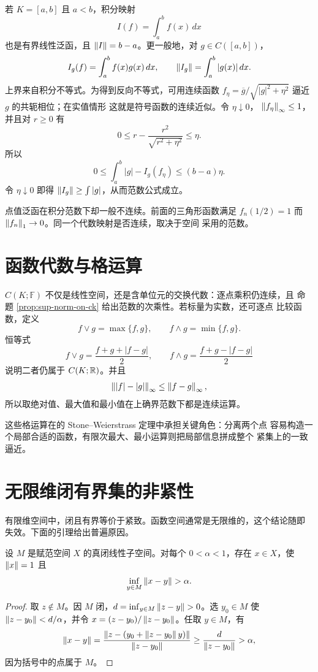 若 $K=[a,b]$ 且 $a<b$，积分映射
\[
 I(f)=\int_a^bf(x)\,dx
\]
也是有界线性泛函，且 $\left\lVert I\right\rVert=b-a$。更一般地，对
$g\in C([a,b])$，
\[
 I_g(f)=\int_a^bf(x)g(x)\,dx,
 \qquad \left\lVert I_g\right\rVert=\int_a^b|g(x)|\,dx.
\]
上界来自积分不等式。为得到反向不等式，可用连续函数
$f_\eta=\overline g/\sqrt{|g|^2+\eta^2}$ 逼近 $g$ 的共轭相位；在实值情形
这就是符号函数的连续近似。令 $\eta\downarrow0$，
$\left\lVert f_\eta\right\rVert_\infty\le1$，并且对 $r\ge0$ 有
\[
 0\le r-\frac{r^2}{\sqrt{r^2+\eta^2}}\le\eta.
\]
所以
\[
 0\le\int_a^b|g|-I_g(f_\eta)\le(b-a)\eta.
\]
令 $\eta\downarrow0$ 即得 $\left\lVert I_g\right\rVert\ge\int|g|$，从而范数公式成立。

点值泛函在积分范数下却一般不连续。前面的三角形函数满足
$f_n(1/2)=1$ 而 $\left\lVert f_n\right\rVert_1\to0$。同一个代数映射是否连续，取决于空间
采用的范数。

\section{函数代数与格运算}

$C(K;\mathbb F)$ 不仅是线性空间，还是含单位元的交换代数：逐点乘积仍连续，且
命题 \ref{prop:sup-norm-on-ck} 给出范数的次乘性。若标量为实数，还可逐点
比较函数，定义
\[
 f\vee g=\max\{f,g\},\qquad f\wedge g=\min\{f,g\}.
\]
恒等式
\[
 f\vee g=\frac{f+g+|f-g|}{2},\qquad
 f\wedge g=\frac{f+g-|f-g|}{2}
\]
说明二者仍属于 $C(K;\mathbb{R})$。并且
\[
 \left\lVert|f|-|g|\right\rVert_\infty\le\left\lVert f-g\right\rVert_\infty,
\]
所以取绝对值、最大值和最小值在上确界范数下都是连续运算。

这些格运算在的
Stone--Weierstrass 定理中承担关键角色：分离两个点
容易构造一个局部合适的函数，有限次最大、最小运算则把局部信息拼成整个
紧集上的一致逼近。

\section{无限维闭有界集的非紧性}

有限维空间中，闭且有界等价于紧致。函数空间通常是无限维的，这个结论随即
失效。下面的引理给出普遍原因。

\begin{lemma}[Riesz 引理]
\label{lem:riesz-lemma}
设 $M$ 是赋范空间 $X$ 的真闭线性子空间。对每个 $0<\alpha<1$，存在
$x\in X$，使 $\left\lVert x\right\rVert=1$ 且
\[
 \inf_{y\in M}\left\lVert x-y\right\rVert>\alpha.
\]
\end{lemma}

\begin{proof}
取 $z\notin M$。因 $M$ 闭，$d=\inf_{y\in M}\left\lVert z-y\right\rVert>0$。选
$y_0\in M$ 使 $\left\lVert z-y_0\right\rVert<d/\alpha$，并令
$x=(z-y_0)/\left\lVert z-y_0\right\rVert$。任取 $y\in M$，有
\[
 \left\lVert x-y\right\rVert=\frac{\left\lVert z-(y_0+\left\lVert z-y_0\right\rVert y)\right\rVert}{\left\lVert z-y_0\right\rVert}
 \ge\frac d{\left\lVert z-y_0\right\rVert}>\alpha,
\]
因为括号中的点属于 $M$。
\end{proof}

